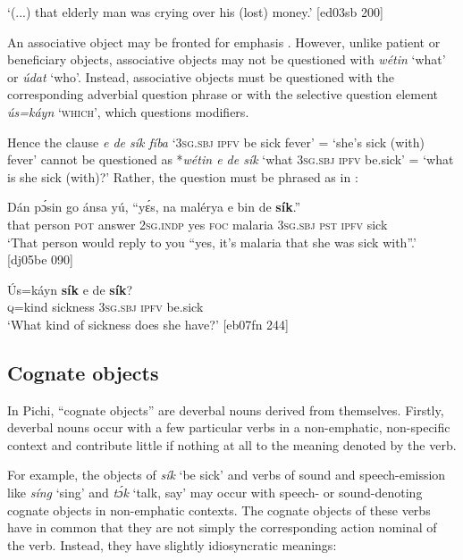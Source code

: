 \glt ‘(...) that elderly man was crying over his (lost) money.’ [ed03sb 200]
\z

An associative object may be fronted for emphasis . However, unlike patient or beneficiary objects, associative objects may not be questioned with \textit{wétin} ‘what’ or \textit{údat} ‘who’. Instead, associative objects must be questioned with the corresponding adverbial question phrase or with the selective question element \textit{ús=káyn} ‘\textsc{which’}, which questions modifiers. 


Hence the clause \textit{e de sík fíba} \textsc{‘3sg.sbj} \textsc{ipfv} be sick fever’ = ‘she’s sick (with) fever’ cannot be questioned as *\textit{wétin e de sík} ‘what \textsc{3sg.sbj} \textsc{ipfv} be.sick’ = ‘what is she sick (with)?’ Rather, the question must be phrased as in :



\ea%
    \label{ex:key:1191}
    \gll Dán    pɔ́sin  go  ánsa    yú,      “yɛ́s,    na  malérya
e    bin  de  \textbf{sík}.”\\
that    person  \textsc{pot}  answer  \textsc{2sg.indp}    yes    \textsc{foc}  malaria
\textsc{3sg.sbj}  \textsc{pst}  \textsc{ipfv}  sick\\

\glt ‘That person would reply to you “yes, it’s malaria that 
she was sick with”.’ [dj05be 090]
\z


\ea%
    \label{ex:key:1192}
    \gll \'{U}s=káyn  \textbf{sík}    e    de  \textbf{sík}? \\
\textsc{q}=kind  sickness  \textsc{3sg.sbj}  \textsc{ipfv}  be.sick\\

\glt ‘What kind of sickness does she have?’ [eb07fn 244]
\z

\subsection{Cognate objects}\label{sec:9.3.3}

In Pichi, “cognate objects” \citep{Baron1971} are deverbal nouns derived from themselves. Firstly, deverbal nouns occur with a few particular verbs in a non-emphatic, non-specific context and contribute little if nothing at all to the meaning denoted by the verb. 


For example, the objects of \textit{sík} ‘be sick’ and verbs of sound and speech-emission like \textit{síng} ‘sing’ and \textit{tɔ́k} ‘talk, say’ may occur with speech- or sound-denoting cognate objects in non-emphatic contexts. The cognate objects of these verbs have in common that they are not simply the corresponding action nominal of the verb. Instead, they have slightly idiosyncratic meanings: 



